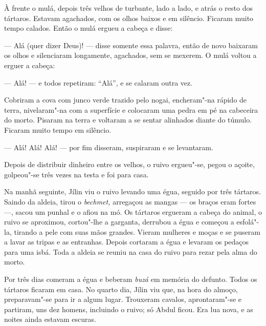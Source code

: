 À frente o mulá, depois três velhos de turbante, lado a lado, e atrás o
resto dos tártaros. Estavam agachados, com os olhos baixos e em
silêncio. Ficaram muito tempo calados. Então o mulá ergueu a cabeça e
disse:

--- Alá (quer dizer Deus)! --- disse somente essa palavra, então de novo
baixaram os olhos e silenciaram longamente, agachados, sem se mexerem. O
mulá voltou a erguer a cabeça:

--- Alá! --- e todos repetiram: ``Alá'', e se calaram outra vez.


Cobriram a cova com junco verde trazido pelo nogai, encheram"-na rápido
de terra, nivelaram"-na com a superfície e colocaram uma pedra em pé na
cabeceira do morto. Pisaram na terra e voltaram a se sentar alinhados
diante do túmulo. Ficaram muito tempo em silêncio.

--- Alá! Alá! Alá! --- por fim disseram, suspiraram e se levantaram.

Depois de distribuir dinheiro entre os velhos, o ruivo ergueu"-se, pegou
o açoite, golpeou"-se três vezes na testa e foi para casa.

Na manhã seguinte, Jílin viu o ruivo levando uma égua, seguido por três tártaros. Saindo da aldeia, tirou o
\emph{bechmet,} arregaçou as mangas --- os braços eram fortes ---, sacou
um punhal e o afiou na mó. Os tártaros ergueram a cabeça do animal, o
ruivo se aproximou, cortou"-lhe a garganta, derrubou a égua e começou a
esfolá"-la, tirando a pele com suas mãos grandes. Vieram mulheres e moças
e se puseram a lavar as tripas e as entranhas. Depois cortaram a égua e
levaram os pedaços para uma isbá. Toda a aldeia se reuniu na casa do
ruivo para rezar pela alma do morto.

Por três dias comeram a égua e beberam \emph{buzá} em memória do
defunto. Todos os tártaros ficaram em casa. No quarto dia, Jílin viu
que, na hora do almoço, preparavam"-se para ir a algum lugar. Trouxeram
cavalos, aprontaram"-se e partiram, uns dez homens, incluindo o ruivo; só
Abdul ficou. Era lua nova, e as noites ainda estavam escuras.


